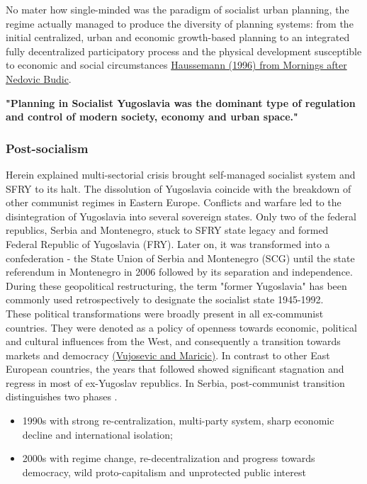 \documentclass[11pt]{report}
\begin{document}
No mater how single-minded was the  paradigm of socialist urban planning, the regime actually managed to produce the diversity of planning systems: from the initial centralized, urban and economic growth-based planning to an integrated fully decentralized participatory process and the physical development susceptible to economic and social circumstances \href{ref}{Haussemann (1996) from Mornings after Nedovic Budic}.

\textbf{"Planning  in  Socialist  Yugoslavia  was  the  dominant  type  of  regulation  and  control  of  modern  society, economy and urban space." \href{ref}{\citealt{vukmirovic_city_2013}}}

\subsubsection{Post-socialism}

Herein explained multi-sectorial crisis brought self-managed socialist system and SFRY to its halt. The dissolution of Yugoslavia coincide with the breakdown of other communist regimes in Eastern Europe. Conflicts and warfare led to the disintegration of Yugoslavia into several sovereign states. Only two of the federal republics, Serbia and Montenegro, stuck to SFRY state legacy and formed Federal Republic of Yugoslavia (FRY). Later on, it was transformed into a confederation - the State Union of Serbia and Montenegro (SCG) until the state referendum in Montenegro in 2006 followed by its separation and independence. During these geopolitical restructuring, the term "former Yugoslavia" has been commonly used retrospectively to designate the socialist state 1945-1992.
\\

These political transformations were broadly present in all ex-communist countries. They were denoted as a policy of openness towards economic, political and cultural influences from the West, and consequently a transition towards markets and democracy \href{ref}{(Vujosevic and Maricic)}. In contrast to other East European countries, the years that followed showed significant stagnation and regress in most of ex-Yugoslav republics. In Serbia, post-communist transition distinguishes two phases \href{ref}{\citealt{nedovic-budic_mornings_2011}} .

\begin{itemize}
\item 1990s with strong re-centralization, multi-party system, sharp economic decline and international isolation;
\item 2000s with regime change, re-decentralization and progress towards democracy, wild proto-capitalism and unprotected public interest
\end{itemize}       
     
\end{document}
